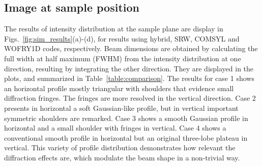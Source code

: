 \documentclass{iucr}              %
\newcommand{\inred}[1]{{\color{red}#1}}
\begin{document}
\newpage




\subsection{Image at sample position}

The results of intensity distribution at the sample plane are display in Figs.~\ref{fig:sim_results}(a)-(d), for results using hybrid, SRW, COMSYL and WOFRY1D codes, respectively.  Beam dimensions are obtained by calculating the full width at half maximum (FWHM) from the intensity distribution at one direction, resulting by integrating the other direction. They are displayed in the plots, and summarized in Table~\ref{table:comparison}.
The results for case 1 shows an horizontal profile mostly triangular with shoulders that evidence small diffraction fringes. The fringes are more resolved in the vertical direction. Case 2  presents in horizontal a soft Gaussian-like profile, but in vertical important symmetric shoulders are remarked. Case 3 shows a smooth Gaussian profile in horizontal and a small shoulder with fringes in vertical. Case 4 shows a conventional smooth profile in horizontal but an original three-lobe plateau in vertical. This variety of profile distribution demonstrates how relevant the diffraction effects are, which modulate the beam shape in a non-trivial way.  

\newpage
\onecolumn
\end{document}
